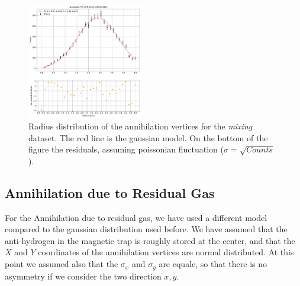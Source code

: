 \documentclass[11pt,a4paper,twocolumn]{article}
\begin{document}
\begin{figure}[hbtp]
\includegraphics[width = 0.45\textwidth]{../PlotMLEfit/SingleModel/GaussianFitMixing.pdf}
\caption{Radius distribution of the annihilation vertices for the \textit{mixing} dataset. The red line is the gaussian model. On the bottom of the figure the residuals, assuming poissonian fluctuation ($\sigma = \sqrt{Counts}$).}
\label{fig:MixingFit}
\end{figure}

\subsection*{Annihilation due to Residual Gas}

For the Annihilation due to residual gas, we have used a different model compared to the gaussian distribution used before. We have assumed that the anti-hydrogen in the magnetic trap is roughly stored at the center, and that the $X$ and $Y$ coordinates of the annihilation vertices are normal distributed. At this point we assumed also that the $\sigma_{x}$ and $\sigma_{y}$ are equale, so that there is no asymmetry if we consider the two direction $x,y$.
\end{document}
